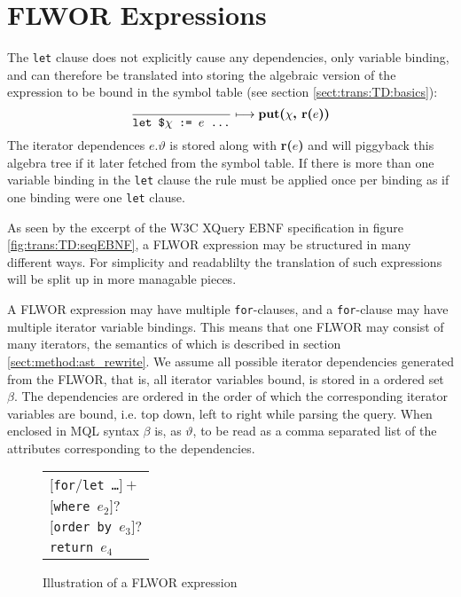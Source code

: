 \section{FLWOR Expressions}
\label{sect:trans:TD:simpleFLWOR}
The \texttt{let} clause does not explicitly cause any dependencies, only variable binding, and can therefore be
translated into storing the algebraic version of the expression to be bound in
the symbol table (see section \ref{sect:trans:TD:basics}):
\begin{equation}
\frac{}{\mbox{\texttt{let \$}}\chi \mbox{\texttt{ := }}e \mbox{\texttt{ \ldots}}}\longmapsto
\mbox{\textbf{put(}}\chi\mbox{\textbf{, r(}}e\mbox{\textbf{))}}
\label{rule:trans:TD:letbind}
\end{equation}
The iterator dependences $e.\vartheta$ is stored along with \textbf{r(}$e$\textbf{)} and will piggyback this
algebra tree if it later fetched from the symbol table. If there is more than one variable binding in the
\texttt{let} clause the rule must be applied once per binding as if one binding were one \texttt{let} clause.

As seen by the excerpt of the W3C XQuery EBNF specification in figure
\ref{fig:trans:TD:seqEBNF}, a FLWOR expression may be structured in many
different ways. For simplicity and readablilty the translation of such
expressions will be split up in more managable pieces.

A FLWOR expression may have multiple \texttt{for}-clauses, and a \texttt{for}-clause may have multiple iterator
variable bindings. This means that one FLWOR may consist of many iterators, the semantics of which is described in
section \ref{sect:method:ast_rewrite}. We assume all possible iterator dependencies generated from the FLWOR, that
is, all iterator variables bound, is stored in a ordered set $\beta$. The dependencies are ordered in the order of
which the corresponding iterator variables are bound, i.e. top down, left to right while parsing the query. When
enclosed in MQL syntax $\beta$ is, as $\vartheta$, to be read as a comma separated list of the attributes
corresponding to the dependencies.

\begin{figure}[h]
\centering
\begin{tabular}{l}
$[$\texttt{for}/\texttt{let \ldots}$]+$ \\ \quad
$[$\texttt{where }$e_2]?$ \\ \quad
$[$\texttt{order by }$e_3]?$ \\
\texttt{return }$e_4$
\end{tabular}
\label{fig:trans:TD:flworIll}
\caption{Illustration of a FLWOR expression}
\end{figure}

